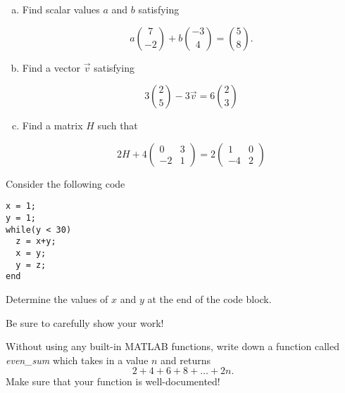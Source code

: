 \documentclass[11pt]{exam}
\theoremstyle{definition}
\begin{document}
\begin{questions}
\newpage
\question[10]\mbox{}

\begin{enumerate}[(a)]
\item Find scalar values $a$ and $b$ satisfying

$$a\binom{7}{-2} + b\binom{-3}{4} = \binom{5}{8}.$$
\vspace{2in}

\item Find a vector $\vec v$ satisfying

$$3\binom{2}{5} -3\vec v = 6\binom{2}{3}$$
\vspace{2in}

\item Find a matrix $H$ such that

$$
2H
+
4\left(\begin{array}{cc}
0 & 3\\-2 & 1
\end{array}\right)
=
2\left(\begin{array}{cc}
1 & 0\\-4 & 2
\end{array}\right)
$$

\end{enumerate}

\newpage
\question[10]\mbox{}
Consider the following code

\begin{lstlisting}
x = 1;
y = 1;
while(y < 30)
  z = x+y;
  x = y;
  y = z;
end
\end{lstlisting}

Determine the values of $x$ and $y$ at the end of the code block.

Be sure to carefully show your work!


\newpage
\question[10]\mbox{}
Without using any built-in MATLAB functions, write down a function called \textit{even\_sum} which takes in a value $n$ and returns
$$2 + 4 + 6 + 8 + \dots + 2n.$$
Make sure that your function is well-documented!


\end{questions}
\end{document}
